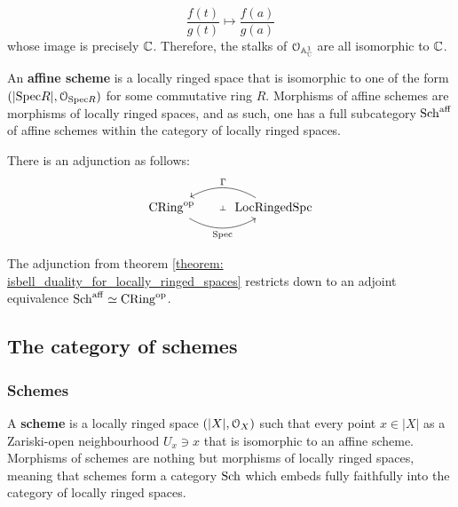 \begin{example}
\begin{enumerate}
		                    $$\frac{f(t)}{g(t)} \mapsto \frac{f(a)}{g(a)}$$
	                    whose image is precisely $\mathbb{C}$. Therefore, the stalks of $\mathcal{O}_{\mathbb{A}^1_{\mathbb{C}}}$ are all isomorphic to $\mathbb{C}$.
			        \end{enumerate}
            \end{example}
        
            \begin{definition} \label{def: affine_schemes}
                An \textbf{affine scheme} is a locally ringed space that is isomorphic to one of the form $(|\mathrm{Spec} R|, \mathcal{O}_{\mathrm{Spec} R})$ for some commutative ring $R$. Morphisms of affine schemes are morphisms of locally ringed spaces, and as such, one has a full subcategory $\mathrm{Sch}^{\mathrm{aff}}$ of affine schemes within the category of locally ringed spaces. 
            \end{definition}
            
            \begin{theorem} \label{theorem: isbell_duality_for_locally_ringed_spaces}
                There is an adjunction as follows:
                    $$
                        \begin{tikzcd}
                        	{\Cring^{\op}} & \Loc\Ringed\Spc
                        	\arrow[""{name=0, anchor=center, inner sep=0}, "\Spec"', bend right, from=1-1, to=1-2]
                        	\arrow[""{name=1, anchor=center, inner sep=0}, "\Gamma"', bend right, from=1-2, to=1-1]
                        	\arrow["\dashv"{anchor=center, rotate=-90}, draw=none, from=1, to=0]
                        \end{tikzcd}
                    $$
            \end{theorem}
            \begin{corollary}
                The adjunction from theorem \ref{theorem: isbell_duality_for_locally_ringed_spaces} restricts down to an adjoint equivalence $\mathrm{Sch}^{\mathrm{aff}} \simeq \mathrm{CRing}^{\mathrm{op}}$.
            \end{corollary}

    \subsection{The category of schemes}
        \subsubsection{Schemes}
            \begin{definition}[Schemes] \label{def: schemes}
                A \textbf{scheme} is a locally ringed space $(|X|, \mathcal{O}_X)$ such that every point $x \in |X|$ as a Zariski-open neighbourhood $U_x \ni x$ that is isomorphic to an affine scheme. Morphisms of schemes are nothing but morphisms of locally ringed spaces, meaning that schemes form a category $\mathrm{Sch}$ which embeds fully faithfully into the category of locally ringed spaces.
            \end{definition}
            
